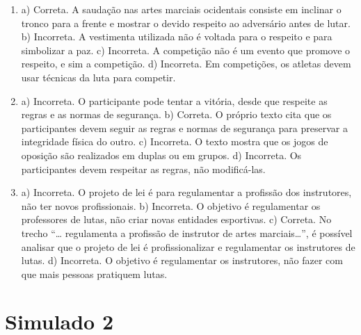 

\begin{enumerate}

\item
a) Correta. A saudação nas artes marciais ocidentais consiste em
inclinar o tronco para a frente e mostrar o devido respeito ao adversário
antes de lutar.
b) Incorreta. A vestimenta utilizada não é voltada para o
respeito e para simbolizar a paz.
c) Incorreta. A competição não é um evento que promove o
respeito, e sim a competição.
d) Incorreta. Em competições, os atletas devem usar técnicas da
luta para competir.

\item
a) Incorreta. O participante pode tentar a vitória, desde que
respeite as regras e as normas de segurança.
b) Correta. O próprio texto cita que os participantes devem
seguir as regras e normas de segurança para preservar a integridade
física do outro.
c) Incorreta. O texto mostra que os jogos de oposição são
realizados em duplas ou em grupos.
d) Incorreta. Os participantes devem respeitar as regras, não modificá-las.

\item
a) Incorreta. O projeto de lei é para regulamentar a profissão dos
instrutores, não ter novos profissionais.
b) Incorreta. O objetivo é regulamentar os professores de lutas, não criar novas entidades esportivas.
c) Correta. No trecho “\ldots{} regulamenta a profissão de instrutor
de artes marciais\ldots{}”, é possível analisar que o projeto de lei é
profissionalizar e regulamentar os instrutores de lutas.
d) Incorreta. O objetivo é regulamentar os instrutores, não
fazer com que mais pessoas pratiquem lutas.
\end{enumerate}

\chapter{Simulado 2}

